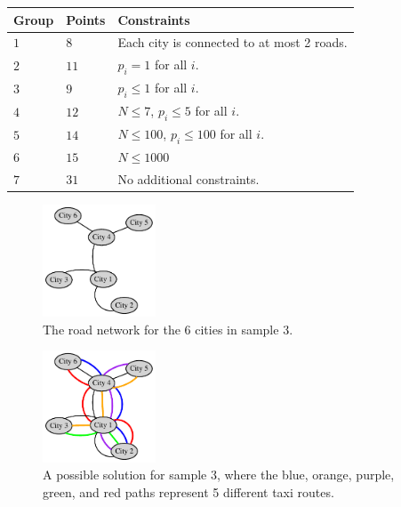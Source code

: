 \noindent
\begin{tabular}{| l | l | p{12cm} |}
  \hline
  \textbf{Group} & \textbf{Points} & \textbf{Constraints} \\ \hline
  $1$    & $8$        & Each city is connected to at most 2 roads. \\ \hline
  $2$    & $11$       & $p_i = 1$ for all $i$. \\ \hline
  $3$    & $9$        & $p_i \leq 1$ for all $i$. \\ \hline
  $4$    & $12$       & $N \leq 7$, $p_i \leq 5$ for all $i$. \\ \hline
  $5$    & $14$       & $N \leq 100$, $p_i \leq 100$ for all $i$. \\ \hline
  $6$    & $15$       & $N \leq 1000$ \\ \hline
  $7$    & $31$       & No additional constraints. \\ \hline
\end{tabular}

\begin{figure}[h!]
  \centering
  \includegraphics[width=0.3\textwidth]{dalarna_sample3.pdf}
  \caption{The road network for the 6 cities in sample 3.}
  \label{fig:dalarna_sample3}
\end{figure}

\begin{figure}[h!]
  \centering
  \includegraphics[width=0.3\textwidth]{dalarna_sample3b.pdf}
  \caption{A possible solution for sample 3, where the blue, orange, purple, green, and red paths represent 5 different taxi routes.}
  \label{fig:dalarna_sample3b}
\end{figure}

